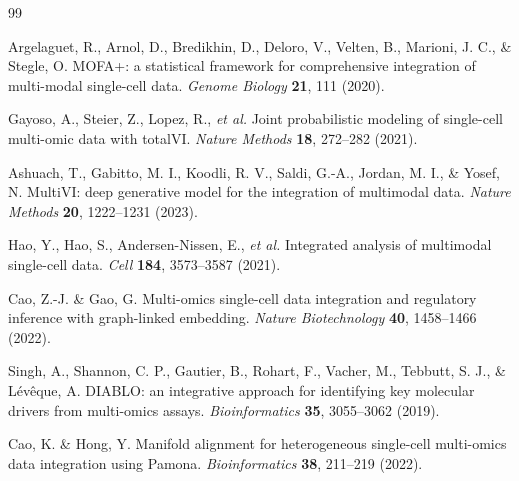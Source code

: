 \documentclass[11pt]{article}
\begin{document}
\begin{thebibliography}{99}

Argelaguet, R., Arnol, D., Bredikhin, D., Deloro, V., Velten, B., Marioni, J. C., \& Stegle, O.
MOFA+: a statistical framework for comprehensive integration of multi-modal single-cell data.
\emph{Genome Biology} \textbf{21}, 111 (2020).

Gayoso, A., Steier, Z., Lopez, R., \emph{et al.}
Joint probabilistic modeling of single-cell multi-omic data with totalVI.
\emph{Nature Methods} \textbf{18}, 272--282 (2021).

Ashuach, T., Gabitto, M. I., Koodli, R. V., Saldi, G.-A., Jordan, M. I., \& Yosef, N.
MultiVI: deep generative model for the integration of multimodal data.
\emph{Nature Methods} \textbf{20}, 1222--1231 (2023).

Hao, Y., Hao, S., Andersen-Nissen, E., \emph{et al.}
Integrated analysis of multimodal single-cell data.
\emph{Cell} \textbf{184}, 3573--3587 (2021).

Cao, Z.-J. \& Gao, G.
Multi-omics single-cell data integration and regulatory inference with graph-linked embedding.
\emph{Nature Biotechnology} \textbf{40}, 1458--1466 (2022).

Singh, A., Shannon, C. P., Gautier, B., Rohart, F., Vacher, M., Tebbutt, S. J., \& L\'ev\^eque, A.
DIABLO: an integrative approach for identifying key molecular drivers from multi-omics assays.
\emph{Bioinformatics} \textbf{35}, 3055--3062 (2019).

Cao, K. \& Hong, Y.
Manifold alignment for heterogeneous single-cell multi-omics data integration using Pamona.
\emph{Bioinformatics} \textbf{38}, 211--219 (2022).

\end{thebibliography}
\end{document}

